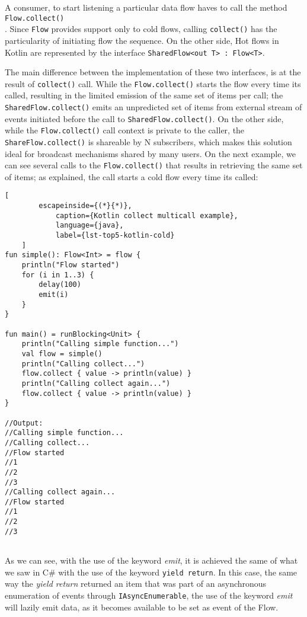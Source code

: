 A consumer, to start listening a particular data flow haves to call the method \texttt{Flow.collect()}\\. Since \texttt{Flow} provides support only to cold flows, calling \texttt{collect()} has the particularity of initiating flow the sequence.
On the other side, Hot flows in Kotlin are represented by the interface \texttt{SharedFlow<out T> : Flow<T>}. 

The main difference between the implementation of these two interfaces, is at the result of \texttt{collect()} call. 
While the \texttt{Flow.collect()} starts the flow every time its called, resulting in the limited emission of the same set of items per call; the \texttt{SharedFlow.collect()} emits an unpredicted set of items from external stream of events initiated before the call to \texttt{SharedFlow.collect()}.
On the other side, while the \texttt{Flow.collect()} call context is private to the caller, the \texttt{ShareFlow.collect()} is shareable by N subscribers, which makes this solution ideal for broadcast mechanisms shared by many users.
On the next example, we can see several calls to the \texttt{Flow.collect()} that results in retrieving the same set of items; as explained, the call starts a cold flow every time its called:

\begin{center}
	\lstset{basicstyle=\scriptsize\ttfamily,frame=bottomline}
	\begin{lstlisting}[
		escapeinside={(*}{*)},
			caption={Kotlin collect multicall example},
			language={java},
			label={lst-top5-kotlin-cold}
	]
fun simple(): Flow<Int> = flow { 
	println("Flow started")
	for (i in 1..3) {
		delay(100)
		emit(i)
	}
}

fun main() = runBlocking<Unit> {
	println("Calling simple function...")
	val flow = simple()
	println("Calling collect...")
	flow.collect { value -> println(value) } 
	println("Calling collect again...")
	flow.collect { value -> println(value) } 
}

//Output:
//Calling simple function...
//Calling collect...
//Flow started
//1
//2
//3
//Calling collect again...
//Flow started
//1
//2
//3
	
	\end{lstlisting}
\end{center}

As we can see, with the use of the keyword \textit{emit}, it is achieved the same of what we saw in C\# with the use of the keyword \texttt{yield return}.
In this case, the same way the \textit{yield return} returned an item that was part of an asynchronous enumeration of events through \texttt{IAsyncEnumerable}, the use of the keyword \textit{emit} will lazily emit data, as it becomes available to be set as event of the Flow.

